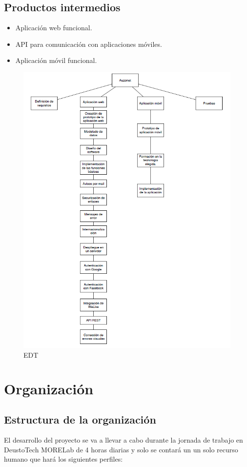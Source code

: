 \documentclass{DeustoFDP}
\begin{document}
\subsection{Productos intermedios}
\begin{itemize}
  \item Aplicación web funcional.
  \item API para comunicación con aplicaciones móviles.
  \item Aplicación móvil funcional.
\end{itemize}
\newpage
\begin{figure}[H]
    \centering
    \includegraphics{fig/EDT}
    \caption{EDT}\label{fig:edt}
\end{figure}

\section{Organización}
\subsection{Estructura de la organización}
El desarrollo del proyecto se va a llevar a cabo durante la jornada de trabajo en DeustoTech MORELab de 4 horas diarias y solo se contará un un solo recurso humano que hará los siguientes perfiles:
\end{document}
